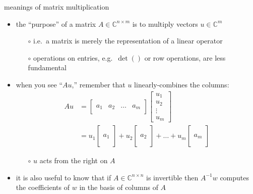 \documentclass[10pt,hyperref]{beamer}
\newcommand{\CC}{\mathbb{C}}
\newcommand{\trefcolumn}[1]{\begin{bmatrix} \phantom{x} \\ #1 \\ \phantom{x} \end{bmatrix}}
\newcommand{\trefmatrixthree}[3]{\left[\begin{array}{c|c|c|c} & & & \\ #1 & #2 & \dots & #3 \\ & & & \end{array}\right]}
\begin{document}
\begin{frame}{meanings of matrix multiplication}

\begin{itemize}
\item the ``purpose'' of a matrix $A \in \CC^{n\times m}$ is to multiply vectors $u\in \CC^m$
    \begin{itemize}
    \item[$\circ$] i.e.~a matrix is merely the representation of a linear operator
    \item[$\circ$] operations on entries, e.g.~$\det()$ or row operations, are less fundamental
    \end{itemize}
\item when you see ``$Au$,'' remember that $u$ linearly-combines the columns:
\small
\begin{align*}
A u &= \trefmatrixthree{a_1}{a_2}{a_m} \begin{bmatrix} u_1 \\ u_2 \\ \vdots \\ u_m \end{bmatrix} \\
    &= u_1 \trefcolumn{a_1} + u_2 \trefcolumn{a_2} + \dots + u_m \trefcolumn{a_m}
\end{align*}
\normalsize
    \begin{itemize}
    \item[$\circ$] $u$ acts from the right on $A$
    \end{itemize}
\item it is also useful to know that if $A \in \CC^{n\times n}$ is invertible then $A^{-1}w$ computes the coefficients of $w$ in the basis of columns of $A$
\end{itemize}
\end{frame}
\end{document}
